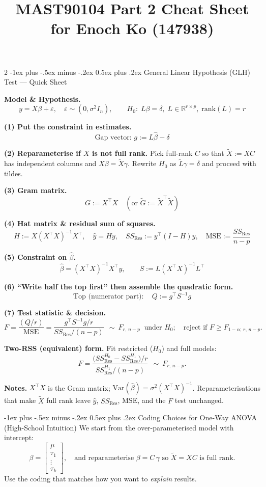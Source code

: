 \documentclass[10pt,landscape]{article}
\title{MAST90104 Part 2 Cheat Sheet for Enoch Ko (147938)}
\makeatletter
\renewcommand{\section}{\@startsection{section}{1}{0mm}%
                                {-1ex plus -.5ex minus -.2ex}%
                                {0.5ex plus .2ex}%
                                {\normalfont\normalsize\bfseries}}
\makeatother
\begin{document}
\raggedright
\footnotesize
\begin{multicols}{2}
\setlength{\premulticols}{1pt}
\setlength{\postmulticols}{1pt}
\setlength{\multicolsep}{1pt}
\setlength{\columnsep}{2pt}
\section{General Linear Hypothesis (GLH) Test — Quick Sheet}

\textbf{Model \& Hypothesis.}
\[
y=X\beta+\varepsilon,\quad \varepsilon\sim(0,\sigma^2 I_n),\qquad
H_0:\;L\beta=\delta,\; L\in\mathbb R^{r\times p},\; \mathrm{rank}(L)=r
\]

\textbf{(1) Put the constraint in estimates.}
\[
\text{Gap vector: } g:=L\hat\beta-\delta
\]

\textbf{(2) Reparameterise if $X$ is not full rank.} Pick full-rank $C$ so that $\tilde X:=XC$ has independent columns and $X\beta=\tilde X\gamma$. Rewrite $H_0$ as $\tilde L\gamma=\delta$ and proceed with tildes.

\textbf{(3) Gram matrix.}
\[
G:=X^\top X\quad (\text{or } \tilde G:=\tilde X^\top \tilde X)
\]

\textbf{(4) Hat matrix \& residual sum of squares.}
\[
H:=X(X^\top X)^{-1}X^\top,\quad \hat y=Hy,\quad
SS_{\mathrm{Res}}:=y^\top(I-H)y,\quad \mathrm{MSE}:=\frac{SS_{\mathrm{Res}}}{n-p}
\]

\textbf{(5) Constraint on $\hat\beta$.}
\[
\hat\beta=(X^\top X)^{-1}X^\top y,\qquad
S:=L(X^\top X)^{-1}L^\top
\]

\textbf{(6) ``Write half the top first'' then assemble the quadratic form.}
\[
\text{Top (numerator part)}:\quad Q:=g^\top S^{-1}g
\]

\textbf{(7) Test statistic \& decision.}
\[
F=\frac{(Q/r)}{\mathrm{MSE}}=\frac{g^\top S^{-1}g/r}{SS_{\mathrm{Res}}/(n-p)}
\ \ \sim\ F_{r,\,n-p}\ \text{ under }H_0;
\quad \text{reject if }F\ge F_{1-\alpha;\,r,\,n-p}.
\]

\textbf{Two-RSS (equivalent) form.} Fit restricted ($H_0$) and full models:
\[
F=\frac{\big(SS_{\mathrm{Res}}^{H_0}-SS_{\mathrm{Res}}^{H_1}\big)/r}{SS_{\mathrm{Res}}^{H_1}/(n-p)}
\ \ \sim\ F_{r,\,n-p}.
\]

\textbf{Notes.} $X^\top X$ is the Gram matrix; $\mathrm{Var}(\hat\beta)=\sigma^2(X^\top X)^{-1}$. Reparameterisations that make $\tilde X$ full rank leave $\hat y$, $SS_{\mathrm{Res}}$, MSE, and the $F$ test unchanged.

\medskip
\section{Coding Choices for One-Way ANOVA (High-School Intuition)}
We start from the over-parameterised model with intercept:
\[
\beta=\begin{bmatrix}\mu\\ \tau_1\\ \vdots\\ \tau_k\end{bmatrix},\quad
\text{and reparameterise } \beta=C\,\gamma \text{ so } \tilde X=XC \text{ is full rank.}
\]
Use the coding that matches how you want to \emph{explain} results.


\end{multicols}
\end{document}
